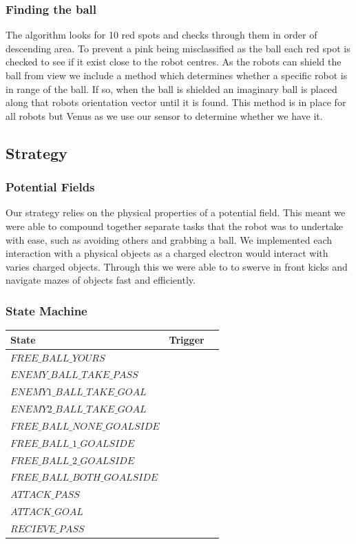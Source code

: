 \documentclass[a4paper,12pt]{article}
\begin{document}
\subsubsection{Finding the ball}
The algorithm looks for 10 red spots and checks through them in order of descending area. To prevent a pink being misclassified as the ball each red spot is checked to see if it exist close to the robot centres. As the robots can shield the ball from view we include a method which determines whether a specific robot is in range of the ball. If so, when the ball is shielded an imaginary ball is placed along that robots orientation vector until it is found. This method is in place for all robots but Venus as we use our sensor to determine whether we have it.

\subsection{Strategy}
\subsubsection{Potential Fields}

Our strategy relies on the physical properties of a potential field. This meant we were able to compound together separate tasks that the robot was to undertake with ease, such as avoiding others and grabbing a ball. We implemented each interaction with a physical objects as a charged electron would interact with varies charged objects. Through this we were able to to swerve in front kicks and navigate mazes of objects fast and efficiently. 

\subsubsection{State Machine}

\begin{tabular}{|l|l|l|}
\hline
State & Trigger\\ \hline
$FREE\_BALL\_YOURS$ &  \\ \hline
$ENEMY\_BALL\_TAKE\_PASS$ &  \\ \hline
$ENEMY1\_BALL\_TAKE\_GOAL$ &  \\ \hline
$ENEMY2\_BALL\_TAKE\_GOAL$ &  \\ \hline
$FREE\_BALL\_NONE\_GOALSIDE$ &  \\ \hline
$FREE\_BALL\_1\_GOALSIDE$ &  \\ \hline
$FREE\_BALL\_2\_GOALSIDE$ &  \\ \hline
$FREE\_BALL\_BOTH\_GOALSIDE$ &  \\ \hline
$ATTACK\_PASS$ &  \\ \hline
$ATTACK\_GOAL$ &   \\ \hline
$RECIEVE\_PASS$ &  \\ \hline
\end{tabular}
\end{document}
